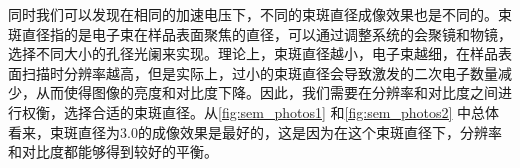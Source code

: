 \documentclass[font=default]{mpltx}
\begin{document}
同时我们可以发现在相同的加速电压下，不同的束斑直径成像效果也是不同的。束斑直径指的是电子束在样品表面聚焦的直径，可以通过调整系统的会聚镜和物镜，选择不同大小的孔径光阑来实现。理论上，束斑直径越小，电子束越细，在样品表面扫描时分辨率越高，但是实际上，过小的束斑直径会导致激发的二次电子数量减少，从而使得图像的亮度和对比度下降。因此，我们需要在分辨率和对比度之间进行权衡，选择合适的束斑直径。从\autoref{fig:sem_photos1} 和\autoref{fig:sem_photos2} 中总体看来，束斑直径为3.0的成像效果是最好的，这是因为在这个束斑直径下，分辨率和对比度都能够得到较好的平衡。
\begin{figure}
  \centering

\end{figure}
\end{document}
